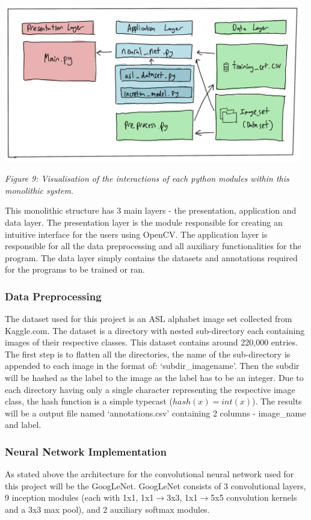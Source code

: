 \documentclass[11pt]{article}
\begin{document}
    \begin{center}
        \includegraphics[width=13cm]{images/monolith1.png}
        \\
        \raggedright \textit{
        Figure 9: Visualisation of the interactions of each python modules within this monolithic system.
        }
    \end{center}

    This monolithic structure has 3 main layers - the presentation, application and data layer. The presentation layer is the module responsible for creating an intuitive interface for the users using OpenCV. The application layer is responsible for all the data preprocessing and all auxiliary functionalities for the program. The data layer simply contains the datasets and annotations required for the programs to be trained or ran. 

        \subsubsection{Data Preprocessing}
    The dataset used for this project is an ASL alphabet image set collected from Kaggle.com. The dataset is a directory with nested sub-directory each containing images of their respective classes. This dataset contains around 220,000 entries. The first step is to flatten all the directories, the name of the sub-directory is appended to each image in the format of: `subdir\_imagename'. Then the subdir will be hashed as the label to the image as the label has to be an integer. Due to each directory having only a single character representing the respective image class, the hash function is a simple typecast ($hash(x) = int(x)$). The results will be a output file named `annotations.csv' containing 2 columns - image\_name and label.
        
        \subsubsection{Neural Network Implementation}
    As stated above the architecture for the convolutional neural network used for this project will be the GoogLeNet. GoogLeNet consists of 3 convolutional layers, 9 inception modules (each with 1x1, 1x1$\rightarrow$3x3, 1x1$\rightarrow$5x5 convolution kernels and a 3x3 max pool), and 2 auxiliary softmax modules.
\end{document}
